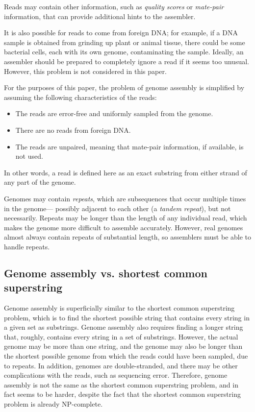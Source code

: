 \documentclass[12pt]{article}
\newcommand{\KeyTerm}[1]{{\it #1}}
\begin{document}
Reads may contain other information, such as \KeyTerm{quality scores} or
\KeyTerm{mate-pair} information, that can provide additional hints to the
assembler.

It is also possible for reads to come from foreign DNA; for example, if a DNA
sample is obtained from grinding up plant or animal tissue, there could be some
bacterial cells, each with its own genome, contaminating the sample.  Ideally,
an assembler should be prepared to completely ignore a read if it seems too
unusual.  However, this problem is not considered in this paper.

For the purposes of this paper, the problem of genome assembly is simplified by
assuming the following characteristics of the reads:

\begin{itemize}
	\item The reads are error-free and uniformly sampled from the genome.
	\item There are no reads from foreign DNA.
	\item The reads are unpaired, meaning that mate-pair information, if
available, is not used.
\end{itemize}

In other words, a read is defined here as an exact substring from either strand
of any part of the genome.

Genomes may contain \KeyTerm{repeats}, which are subsequences that occur
multiple times in the genome--- possibly adjacent to each other (a
\KeyTerm{tandem repeat}), but not necessarily.  Repeats may be longer than the
length of any individual read, which makes the genome more difficult to assemble
accurately.  However, real genomes almost always contain repeats of substantial
length, so assemblers must be able to handle repeats.

\subsection{Genome assembly vs. shortest common superstring}

Genome assembly is superficially similar to the shortest common superstring
problem, which is to find the shortest possible string that contains every
string in a given set as substrings.  Genome assembly also requires finding a
longer string that, roughly, contains every string in  a set of substrings.
However, the actual genome may be more than one string, and the genome may also
be longer than the shortest possible genome from which the reads could have been
sampled, due to repeats.  In addition,  genomes are double-stranded, and there
may be other complications with the reads, such as sequencing error.  Therefore,
genome assembly is not the same as the shortest common superstring problem, and
in fact seems to be harder, despite the fact that the shortest common
superstring problem is already NP-complete\cite{Turner1989}.
\end{document}
